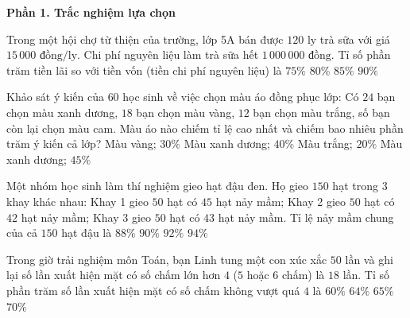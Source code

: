 \textbf{Phần 1. Trắc nghiệm lựa chọn}

\begin{ex} %
Trong một hội chợ từ thiện của trường, lớp 5A bán được $120$ ly trà sữa với giá $15\,000\text{ đồng/ly}$. Chi phí nguyên liệu làm trà sữa hết $1\,000\,000\text{ đồng}$. Tỉ số phần trăm tiền lãi so với tiền vốn (tiền chi phí nguyên liệu) là
\choice
{$75\%$}
{\True $80\%$}
{$85\%$}
{$90\%$}
\end{ex}

\begin{ex} %
Khảo sát ý kiến của $60$ học sinh về việc chọn màu áo đồng phục lớp: Có $24$ bạn chọn màu xanh dương, $18$ bạn chọn màu vàng, $12$ bạn chọn màu trắng, số bạn còn lại chọn màu cam. Màu áo nào chiếm tỉ lệ cao nhất và chiếm bao nhiêu phần trăm ý kiến cả lớp?
\choice
{Màu vàng; $30\%$}
{\True Màu xanh dương; $40\%$}
{Màu trắng; $20\%$}
{Màu xanh dương; $45\%$}
\end{ex}

\begin{ex} %
Một nhóm học sinh làm thí nghiệm gieo hạt đậu đen. Họ gieo $150$ hạt trong $3$ khay khác nhau: Khay 1 gieo $50$ hạt có $45$ hạt nảy mầm; Khay 2 gieo $50$ hạt có $42$ hạt nảy mầm; Khay 3 gieo $50$ hạt có $43$ hạt nảy mầm. Tỉ lệ nảy mầm chung của cả $150$ hạt đậu là
\choice
{$88\%$}
{\True $90\%$}
{$92\%$}
{$94\%$}
\end{ex}

\begin{ex} %
Trong giờ trải nghiệm môn Toán, bạn Linh tung một con xúc xắc $50$ lần và ghi lại số lần xuất hiện mặt có số chấm lớn hơn $4$ ($5$ hoặc $6$ chấm) là $18$ lần. Tỉ số phần trăm số lần xuất hiện mặt có số chấm không vượt quá $4$ là
\choice
{$60\%$}
{\True $64\%$}
{$65\%$}
{$70\%$}
\end{ex}

